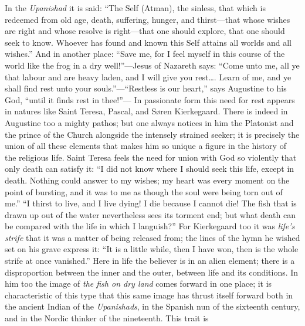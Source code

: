 \documentclass[12pt,a4paper]{book}
\newcommand{\opage}[1]{\marginnote{\footnotesize\textit{[#1]}}}
\begin{document}
In the \emph{Upanishad} it is said: ``The Self (Atman), the sinless, that which
is redeemed from old age, death, suffering, hunger, and thirst---that whose
wishes are right and whose resolve is right---that one should explore, that one
should seek to know. Whoever has found and known this Self attains all worlds
and all wishes.'' And in another place: ``Save me, for I feel myself in this
course of the world like the frog in a dry well!''---Jesus of Nazareth says:
``Come unto me, all ye that labour and are heavy laden, and I will give you
rest\ldots. Learn of me, and ye shall find rest unto your souls.''---``Restless
is our heart,'' says Augustine to his God, ``until it finds rest in thee!''---
In passionate form this need for rest appears in natures like Saint Teresa,
Pascal, and Søren Kierkegaard.
There is indeed in Augustine too a mighty pathos; but one always notices in him
the Platonist and the prince of the Church alongside the intensely strained
seeker; it is precisely the union of all these elements that makes him so unique
a figure in the history of the religious life. Saint Teresa feels the need for
union with God so violently that only death can satisfy it: ``I did not know
where I should seek this life, except in death. Nothing could answer to my
wishes; my heart was every moment on the point of bursting, and it was to me as
though the soul were being torn out of me.'' ``I thirst to live, and I live
dying! I die because I cannot die! The fish that is drawn up out of the water
nevertheless sees its torment end; but what death can be compared with the life
in which I languish?'' For Kierkegaard too it was \emph{life's strife} that it
was a matter of being released from; the lines of the hymn he wished set on his
grave express it:
``It is a little while, then I have won, then is the whole strife at once
vanished.'' Here in life the believer is in an alien element; there is a disproportion
between the inner and the outer, between life and its conditions. In him too the
image of \emph{the fish on dry land} comes forward in one place; it is
characteristic of this type that this same image has thrust itself forward both
in the ancient Indian of the \emph{Upanishads}, in the Spanish nun of the
sixteenth century, and in the Nordic thinker of the 
\opage{74}nineteenth. This trait is
\end{document}
